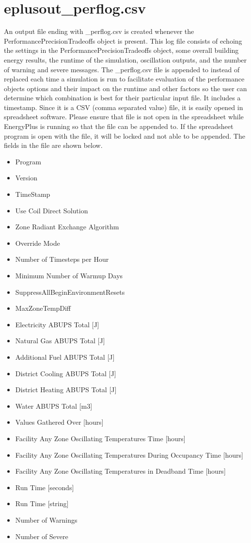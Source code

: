 \section{eplusout\_perflog.csv}

An output file ending with \_perflog.csv is created whenever the PerformancePrecisionTradeoffs object is present. This log file consists of echoing the settings in the PerformancePrecisionTradeoffs object, 
some overall building energy results, the runtime of the simulation, oscillation outputs, and the number of warning and severe messages. The \_perflog.csv
file is appended to instead of replaced each time a simulation is run to facilitate evaluation of the performance objects options and their impact on the runtime and other factors so  
the user can determine which combination is best for their particular input file. It includes a timestamp. Since it is a CSV (comma separated value) file, it is easily opened in spreadsheet software. Please ensure that file is 
not open in the spreadsheet while EnergyPlus is running so that the file can be appended to. If the spreadsheet program is open with the file, it will be locked and not able to be appended. The fields in the
file are shown below.


\begin{itemize}
\item
  Program
\item
  Version
\item
  TimeStamp
\item
  Use Coil Direct Solution
\item
  Zone Radiant Exchange Algorithm
\item
  Override Mode
\item
  Number of Timesteps per Hour
\item
  Minimum Number of Warmup Days
\item
  SuppressAllBeginEnvironmentResets
\item
  MaxZoneTempDiff
\item
  Electricity ABUPS Total [J]
\item
  Natural Gas ABUPS Total [J]
\item
  Additional Fuel ABUPS Total [J]
\item
  District Cooling ABUPS Total [J]
\item
  District Heating ABUPS Total [J]
\item
  Water ABUPS Total [m3]
\item
  Values Gathered Over [hours]
\item
  Facility Any Zone Oscillating Temperatures Time [hours]
\item
  Facility Any Zone Oscillating Temperatures During Occupancy Time [hours]
\item
  Facility Any Zone Oscillating Temperatures in Deadband Time [hours]
\item
  Run Time [seconds]
\item
  Run Time [string]
\item
  Number of Warnings
\item
  Number of Severe
\end{itemize}

